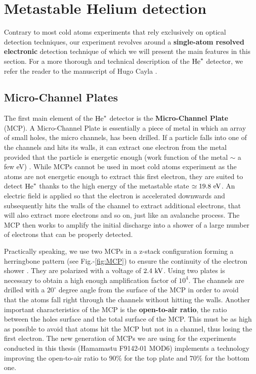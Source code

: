 \section{Metastable Helium detection}


Contrary to most cold atoms experiments that rely exclusively on optical detection techniques, our experiment revolves around a \textbf{single-atom resolved} \textbf{electronic} detection technique of which we will present the main features in this section. For a more thorough and technical description of the $\mathrm{He}^*$ detector, we refer the reader to the manuscript of Hugo Cayla \cite{cayla_these}.

\subsection{Micro-Channel Plates}

The first main element of the $\mathrm{He}^*$ detector is the \textbf{Micro-Channel Plate} (MCP). A Micro-Channel Plate is essentially a piece of metal in which an array of small holes, the micro channels, has been drilled. If a particle falls into one of the channels and hits its walls, it can extract one electron from the metal provided that the particle is energetic enough (work function of the metal $\sim$ a few eV) \cite{harada1997electron}. While MCPs cannot be used in most cold atoms experiment as the atoms are not energetic enough to extract this first electron, they are suited to detect $\mathrm{He}^*$ thanks to the high energy of the metastable state $\simeq 19.8 \ \rm{eV}$. An electric field is applied so that the electron is accelerated downwards and subsequently hits the walls of the channel to extract additional electrons, that will also extract more electrons and so on, just like an avalanche process. The MCP then works to amplify the initial discharge into a shower of a large number of electrons that can be properly detected. 

Practically speaking, we use two MCPs in a z-stack configuration forming a herringbone pattern (see Fig.-\ref{fig:MCP}) to ensure the continuity of the electron shower \cite{hoendervanger2013influence}. They are polarized with a voltage of $2.4 \ \rm{kV}$. Using two plates is necessary to obtain a high enough amplification factor of $10^4$. The channels are drilled with a $20^{\circ}$ degree angle from the surface of the MCP in order to avoid that the atoms fall right through the channels without hitting the walls. Another important characteristics of the MCP is the \textbf{open-to-air ratio}, \ie the ratio between the holes surface and the total surface of the MCP. This must be as high as possible to avoid that atoms hit the MCP but not in a channel, thus losing the first electron. The new generation of MCPs we are using for the experiments conducted in this thesis (Hamamastu F9142-01 MOD6) implements a technology improving the open-to-air ratio to $90\%$ for the top plate and $70 \%$ for the bottom one.

